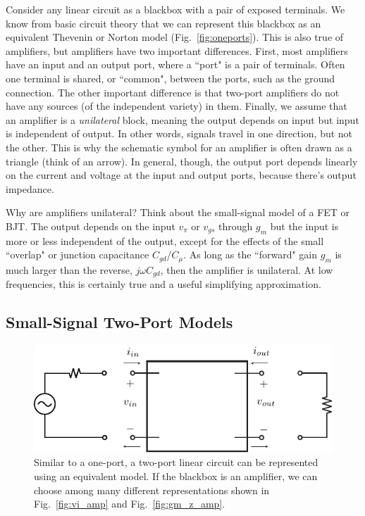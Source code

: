 Consider any linear circuit as a blackbox with a pair of exposed terminals.  We know from basic circuit theory that we can represent this blackbox as an equivalent Thevenin or Norton model (Fig.~\ref{fig:oneports}).  This is also true of amplifiers, but amplifiers have two important differences.  First, most amplifiers have an input and an output port, where a ``port" is a  pair of terminals.  Often one terminal is shared, or ``common", between the ports, such as the ground connection.   The other important difference is that two-port amplifiers do not have any sources (of the independent variety) in them.  Finally, we assume that an amplifier is a \textit{unilateral} block, meaning the output depends on input but input is independent of output.  In other words, signals travel in one direction, but not the other.  This is why the schematic symbol for an amplifier is often drawn as a triangle (think of an arrow).  In general, though, the output port depends linearly on the current and voltage at the input and output ports, because there's output impedance.  

Why are amplifiers unilateral?  Think about the small-signal model of a FET or BJT.  The output depends on the input $v_{\pi}$ or $v_{gs}$ through $g_m$ but the input is more or less independent of the output, except for the effects of the small ``overlap" or junction capacitance $C_{gd}$/$C_\mu$.  As long as the ``forward" gain $g_m$ is much larger than the reverse, $j\omega C_{gd}$, then the amplifier is unilateral.  At low frequencies, this is certainly true and a useful simplifying approximation.


 

\subsection{Small-Signal Two-Port Models}


\begin{figure}[tb]
\begin{center}
\includegraphics[scale=1]{2port_ss}
\end{center}
\caption{Similar to a one-port, a two-port linear circuit can be represented using an equivalent model.  If the blackbox is an amplifier, we can choose among many different representations shown in Fig.~\ref{fig:vi_amp} and Fig.~\ref{fig:gm_z_amp}.} \label{fig:2port_ss}
\end{figure}

